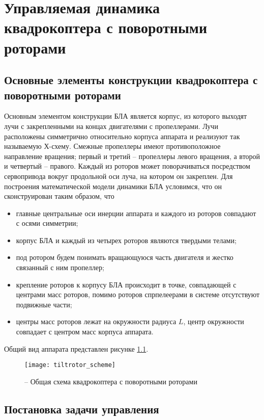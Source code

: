
\chapter{Управляемая динамика квадрокоптера с поворотными роторами}
\label{chapter_dyn}

\section{Основные элементы конструкции квадрокоптера с поворотными роторами}

Основным элементом конструкции БЛА является корпус, из которого выходят лучи с закрепленными на концах двигателями с пропеллерами. Лучи расположены симметрично относительно корпуса аппарата и реализуют так называемую Х-схему. Смежные пропеллеры имеют противоположное направление вращения; первый и третий – пропеллеры левого вращения, а второй и четвертый – правого. Каждый из роторов может поворачиваться посредством сервопривода вокруг продольной оси луча, на котором он закреплен. Для построения математической модели динамики БЛА условимся, что он сконструирован таким образом, что
\begin{itemize}
	\item главные центральные оси инерции аппарата и каждого из роторов совпадают с осями симметрии; 
	\item корпус БЛА и каждый из четырех роторов являются твердыми телами; 
	\item под ротором будем понимать вращающуюся часть двигателя и жестко связанный с ним пропеллер; 
	\item крепление роторов к корпусу БЛА происходит в точке, совпадающей с центрами масс роторов, помимо роторов спрпелеерами в системе отсутствуют подвижные части;
	\item центры масс роторов лежат на окружности радиуса $L$, центр окружности совпадает с центром масс корпуса аппарата.
\end{itemize}
Общий вид аппарата представлен рисунке \ref{fig:tiltrotor_scheme}.

\begin{figure}[h]
	\centering
	\texttt{[image: tiltrotor\_scheme]}
	\caption{ -- Общая схема квадрокоптера с поворотными роторами}
	\label{fig:tiltrotor_scheme}
\end{figure}

\section{Постановка задачи управления}
\label{section_ctrl_task}
	
